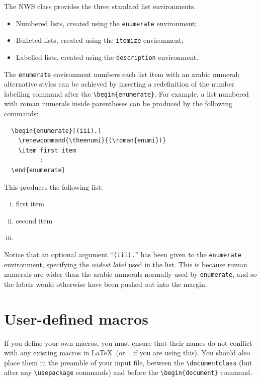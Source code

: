 \documentclass{article}
\begin{document}
The NWS class provides the three standard list environments.
\begin{itemize}
  \item Numbered lists, created using the \verb"enumerate" environment;
  \item Bulleted lists, created using the \verb"itemize" environment;
  \item Labelled lists, created using the \verb"description" environment.
\end{itemize}
The \verb"enumerate" environment numbers each list item with an arabic numeral;
alternative styles can be achieved by inserting a redefinition of the
number labelling command after the \verb"\begin{enumerate}". For example, a
list numbered with roman numerals inside parentheses can be produced by the
following commands:
%
\begin{verbatim}
  \begin{enumerate}[(iii).]
    \renewcommand{\theenumi}{(\roman{enumi})}
    \item first item
          :
  \end{enumerate}
\end{verbatim}
%
This produces the following list:
%
\begin{enumerate}[(iii).]
  \renewcommand{\theenumi}{(\roman{enumi})}
  \item first item
  \item second item
  \item \etc
\end{enumerate}
%
Notice that an optional argument ``\verb"(iii)."'' has been given to the
\verb"enumerate" environment, specifying the \emph{widest label} used in the
list. This is because roman numerals are wider than the arabic numerals
normally used by \verb"enumerate", and so the labels would otherwise have been
pushed out into the margin.

\section{User-defined macros}

If you define your own macros, you must ensure that their names do not
conflict with any existing macros in \LaTeX\ (or \AMSLaTeX\ %
if you are using this). You should also place them in the preamble of
your input file, between the \verb"\documentclass" (but after any
\verb"\usepackage" commands) and before the \verb"\begin{document}" command.
\end{document}
